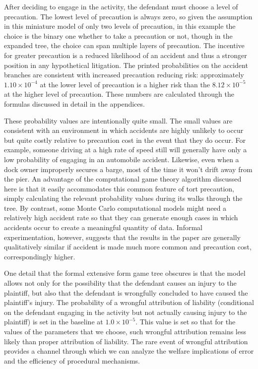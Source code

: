 \documentclass{article}
\begin{document}
After deciding to engage in the activity, the defendant must choose a level of precaution. The lowest level of precaution is always zero, so given the assumption in this miniature model of only two levels of precaution, in this example the choice is the binary one whether to take a precaution or not, though in the expanded tree, the choice can span multiple layers of precaution. The incentive for greater precaution is a reduced likelihood of an accident and thus a stronger position in any hypothetical litigation. The printed probabilities on the accident branches are consistent with increased precaution reducing risk: approximately $1.10 \times 10^{-4}$ at the lower level of precaution is a higher risk than the $8.12 \times 10^{-5}$ at the higher level of precaution. These numbers are calculated through the formulas discussed in detail in the appendices.

These probability values are intentionally quite small. The small values are consistent with an environment in which accidents are highly unlikely to occur but quite costly relative to precaution cost in the event that they do occur. For example, someone driving at a high rate of speed still will generally have only a low probability of engaging in an automobile accident. Likewise, even when a dock owner improperly secures a barge, most of the time it won't drift away from the pier. An advantage of the computational game theory algorithm discussed here is that it easily accommodates this common feature of tort precaution, simply calculating the relevant probability values during its walks through the tree. By contrast, some Monte Carlo computational models might need a relatively high accident rate so that they can generate enough cases in which accidents occur to create a meaningful quantity of data. Informal experimentation, however, suggests that the results in the paper are generally qualitatively similar if accident is made much more common and precaution cost, correspondingly higher.

One detail that the formal extensive form game tree obscures is that the model allows not only for the possibility that the defendant causes an injury to the plaintiff, but also that the defendant is wrongfully concluded to have caused the plaintiff's injury. The probability of a wrongful attribution of liability (conditional on the defendant engaging in the activity but not actually causing injury to the plaintiff) is set in the baseline at $1.0 \times 10^{-5}$. This value is set so that for the values of the parameters that we choose, such wrongful attribution remains less likely than proper attribution of liability. The rare event of wrongful attribution provides a channel through which we can analyze the welfare implications of error and the efficiency of procedural mechanisms. 
\end{document}
